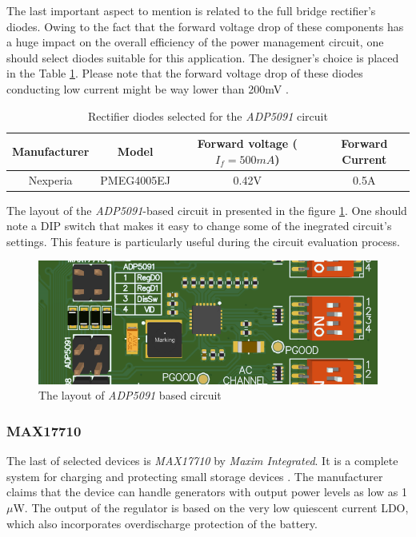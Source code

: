 \documentclass[12pt,a4paper]{article}
\begin{document}
The last important aspect to mention is related to the full bridge rectifier's diodes. Owing to the fact that the forward voltage drop of these components has a huge impact on the overall efficiency of the power management circuit, one should select diodes suitable for this application. The designer's choice is placed in the Table \ref{tab:adp5091_diodes}. Please note that the forward voltage drop of these diodes conducting low current might be way lower than 200mV \cite{diodes_params}.
\begin{table}[ht!]
\begin{tabular}{|c|c|c|c|}
\hline
\textbf{Manufacturer} & \textbf{Model} & \textbf{Forward voltage ($I_f=500mA$)} & \textbf{Forward Current}\\ \hline
 Nexperia & PMEG4005EJ & 0.42V & 0.5A      \\ \hline

\end{tabular}
\caption{Rectifier diodes selected for the \textit{ADP5091} circuit \cite{diodes_params}}
\label{tab:adp5091_diodes}
\end{table}
\par

The layout of the \textit{ADP5091}-based circuit in presented in the figure \ref{fig:adp5091layout}. One should note a DIP switch that makes it easy to change some of the inegrated circuit's settings. This feature is particularly useful during the circuit evaluation process.
\begin{figure}[ht!]
\includegraphics[scale=0.8]{adp5091_layout.png}
\caption{The layout of \textit{ADP5091} based circuit}
\label{fig:adp5091layout}
\end{figure}
\par
\subsubsection{MAX17710}
The last of selected devices is \textit{MAX17710} by \textit{Maxim Integrated}. It is a complete system for charging and protecting small storage devices \cite{max17710_params}. The manufacturer claims that the device can handle generators with output power levels as low as 1$\mu$W. The output of the regulator is based on the very low quiescent current LDO, which also incorporates overdischarge protection of the battery.
\par
\end{document}
